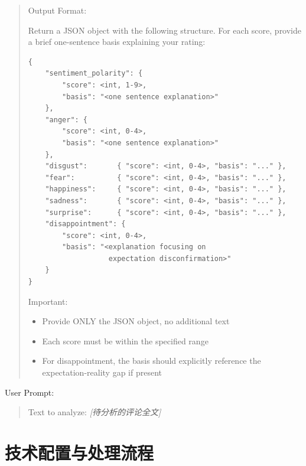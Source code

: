 \documentclass[
    type = master, %
    degree = professional,        %
    decl-page,  %
    twoside,                %
    fontset = fandol %
  ]{njuthesis}
\begin{document}
\begin{quote}
\medskip
Output Format:

Return a JSON object with the following structure. For each score, provide a brief
one-sentence basis explaining your rating:

\begin{verbatim}
{
    "sentiment_polarity": {
        "score": <int, 1-9>,
        "basis": "<one sentence explanation>"
    },
    "anger": {
        "score": <int, 0-4>,
        "basis": "<one sentence explanation>"
    },
    "disgust":       { "score": <int, 0-4>, "basis": "..." },
    "fear":          { "score": <int, 0-4>, "basis": "..." },
    "happiness":     { "score": <int, 0-4>, "basis": "..." },
    "sadness":       { "score": <int, 0-4>, "basis": "..." },
    "surprise":      { "score": <int, 0-4>, "basis": "..." },
    "disappointment": {
        "score": <int, 0-4>,
        "basis": "<explanation focusing on
                   expectation disconfirmation>"
    }
}
\end{verbatim}

Important:
\begin{itemize}
  \item Provide ONLY the JSON object, no additional text
  \item Each score must be within the specified range
  \item For disappointment, the basis should explicitly reference the expectation-reality gap if present
\end{itemize}
\end{quote}

\vspace{0.5em}
\noindent User Prompt:
\begin{quote}\small
Text to analyze: \textit{[待分析的评论全文]}
\end{quote}

\section{技术配置与处理流程}
\end{document}
